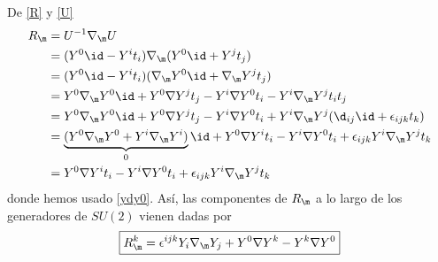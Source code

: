 De \eqref{R} y \eqref{U}
\begin{align}
  R_\m&=U^{-1}\nabla_\m U\\
  &=(Y^0\id-Y^{i}t_i)\nabla_\m (Y^0\id +Y^jt_j)\\
  &=(Y^0\id-Y^{i}t_i)(\nabla_\m Y^0\id +\nabla_\m Y^jt_j)\\
  &=Y^0\nabla_\m Y^0\id+Y^0\nabla Y^jt_j-Y^{i}\nabla Y^0t_i-Y^{i}\nabla_\m Y^jt_it_j\\
  &=Y^0\nabla_\m Y^0\id+Y^0\nabla Y^jt_j-Y^{i}\nabla Y^0t_i+Y^{i}\nabla_\m Y^j(\d_{ij}\id+\epsilon_{ijk}t_k)\\
  &=\underbrace{(Y^0\nabla_\m Y^0+Y^{i}\nabla_\m Y^{i})}_0\id +Y^0\nabla Y^it_i-Y^{i}\nabla Y^0t_i+\epsilon_{ijk}Y^{i}\nabla_\m Y^jt_k\\
  &=Y^0\nabla Y^it_i-Y^{i}\nabla Y^0t_i+\epsilon_{ijk}Y^{i}\nabla_\m Y^jt_k
\end{align}
donde hemos usado \eqref{ydy0}. Así, las componentes de $R_\m $ a lo largo de los generadores de $SU(2)$ vienen dadas por
\begin{equation}
  \boxed{R_\m^k=\epsilon^{ijk}Y_{i}\nabla_\m Y_j+Y^0\nabla Y^k-Y^{k}\nabla Y^0}
\end{equation}














































